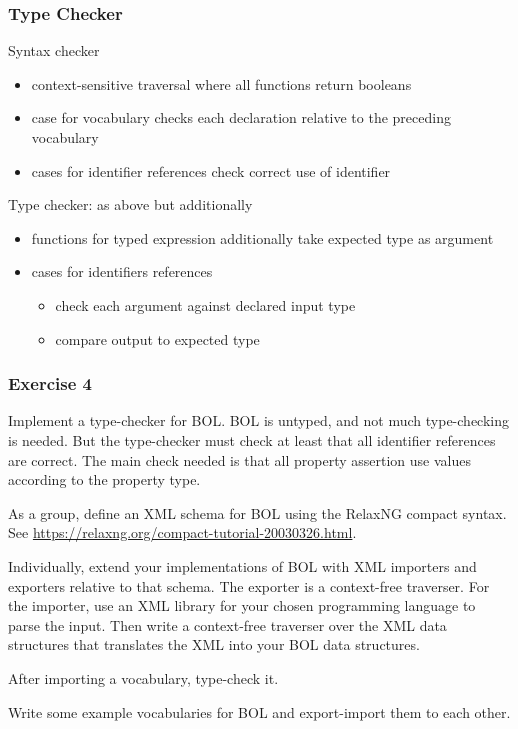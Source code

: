 \begin{frame}\frametitle{Type Checker}
Syntax checker
\begin{itemize}
 \item context-sensitive traversal where all functions return booleans
 \item case for vocabulary checks each declaration relative to the preceding vocabulary
 \item cases for identifier references check correct use of identifier
\end{itemize}

Type checker: as above but additionally
\begin{itemize}
 \item functions for typed expression additionally take expected type as argument
 \item cases for identifiers references
   \begin{itemize}
   \item check each argument against declared input type
   \item compare output to expected type
   \end{itemize}
\end{itemize}
\end{frame}

\begin{frame}\frametitle{Exercise 4}
Implement a type-checker for BOL.
BOL is untyped, and not much type-checking is needed.
But the type-checker must check at least that all identifier references are correct.
The main check needed is that all property assertion use values according to the property type.


As a group, define an XML schema for BOL using the RelaxNG compact syntax. See \url{https://relaxng.org/compact-tutorial-20030326.html}.

Individually, extend your implementations of BOL with XML importers and exporters relative to that schema.
The exporter is a context-free traverser.
For the importer, use an XML library for your chosen programming language to parse the input. Then write a context-free traverser over the XML data structures that translates the XML into your BOL data structures.

After importing a vocabulary, type-check it.

Write some example vocabularies for BOL and export-import them to each other.
\end{frame}


%
